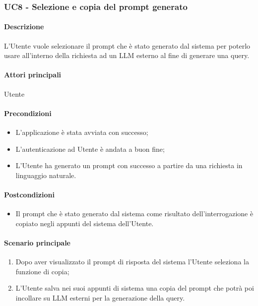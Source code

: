 \subsubsection{UC8 - Selezione e copia del prompt generato}\label{UC8}

\paragraph*{Descrizione}
L’Utente vuole selezionare il prompt che è stato generato dal sistema per poterlo usare all’interno della richiesta ad un LLM esterno al fine di generare una query.

\paragraph*{Attori principali}
Utente

\paragraph*{Precondizioni}
\begin{itemize}
  \item L'applicazione è stata avviata con successo;
  \item L’autenticazione ad Utente è andata a buon fine;
  \item L’Utente ha generato un prompt con successo a partire da una richiesta in linguaggio naturale.  
\end{itemize}

\paragraph*{Postcondizioni}
\begin{itemize}
  \item Il prompt che è stato generato dal sistema come risultato dell’interrogazione è copiato negli appunti del sistema dell’Utente.
\end{itemize}

\paragraph*{Scenario principale}
\begin{enumerate}
  \item Dopo aver visualizzato il prompt di risposta del sistema l’Utente seleziona la funzione di copia;
  \item L’Utente salva nei suoi appunti di sistema una copia del prompt che potrà poi incollare su LLM esterni per la generazione della query.
\end{enumerate}